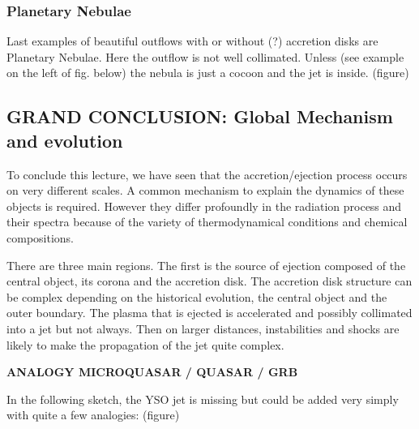 \documentclass[10pt,a4paper,english]{article}
\begin{document}
\subsubsection{Planetary Nebulae}
Last examples of beautiful outflows with or without (?) accretion disks are Planetary Nebulae. Here the outflow is not well collimated. Unless (see example on the left of fig. below) the nebula is just a cocoon and the jet is inside. (figure)

\subsection{GRAND CONCLUSION: Global Mechanism and evolution}

To conclude this lecture, we have seen that the accretion/ejection process occurs on very different scales. A common mechanism to explain the dynamics of these objects is required. However they differ profoundly in the radiation process and their spectra because of the variety of thermodynamical conditions and chemical compositions.

There are three main regions. The first is the source of ejection composed of the central object, its corona and the accretion disk. The accretion disk structure can be complex depending on the historical evolution, the central object and the outer boundary. The plasma that is ejected is accelerated and possibly collimated into a jet but not always. Then on larger distances, instabilities and shocks are likely to make the propagation of the jet quite complex.

\textbf{ANALOGY MICROQUASAR / QUASAR / GRB}

In the following sketch, the YSO jet is missing but could be added very simply with quite a few analogies: (figure)

\appendix

\makeatletter
\def\@seccntformat#1{Appendix~\csname the#1\endcsname:\quad}
\makeatother

\newpage




\listoffixmes
\end{document}
